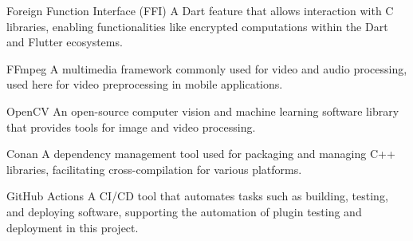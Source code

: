 \begin{glossary}
\item[Foreign Function Interface (FFI)] A Dart feature that allows interaction with C libraries, enabling functionalities like encrypted computations within the Dart and Flutter ecosystems.

\item[FFmpeg] A multimedia framework commonly used for video and audio processing, used here for video preprocessing in mobile applications.

\item[OpenCV] An open-source computer vision and machine learning software library that provides tools for image and video processing.

\item[Conan] A dependency management tool used for packaging and managing C++ libraries, facilitating cross-compilation for various platforms.

\item[GitHub Actions] A CI/CD tool that automates tasks such as building, testing, and deploying software, supporting the automation of plugin testing and deployment in this project.

\end{glossary}
